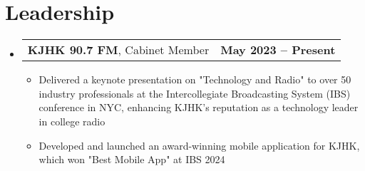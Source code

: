 \documentclass[letter,11pt]{article}
\makeatletter
\newcommand{\resumeItem}[1]{
	\item \small{{#1 \vspace{-2pt}}}
}
\newcommand{\resumeSubheading}[3]{
	\vspace{-2pt}\item
	\begin{tabular*}{1.0\textwidth}[t]{l@{\extracolsep{\fill}}r}
		\textbf{#1}, {\small #2} & \textbf{\small #3} \\
	\end{tabular*}\vspace{-5pt}
}
\newcommand{\resumeSubHeadingListStart}{\begin{itemize}[leftmargin=0.0in, label={}]}
\newcommand{\resumeSubHeadingListEnd}{\end{itemize}}
\newcommand{\resumeItemListStart}{\begin{itemize}[leftmargin=0.5cm]}
\newcommand{\resumeItemListEnd}{\end{itemize}\vspace{-5pt}}
\makeatother
\begin{document}
\section{Leadership}
	\resumeSubHeadingListStart
		\resumeSubheading{KJHK 90.7 FM}{Cabinet Member}{May 2023 -- Present}
			\resumeItemListStart
                \resumeItem{Delivered a keynote presentation on "Technology and Radio" to over 50 industry professionals at the Intercollegiate Broadcasting System (IBS) conference in NYC, enhancing KJHK's reputation as a technology leader in college radio}
                \resumeItem{Developed and launched an award-winning mobile application for KJHK, which won "Best Mobile App" at IBS 2024}
			\resumeItemListEnd
	\resumeSubHeadingListEnd
\end{document}
